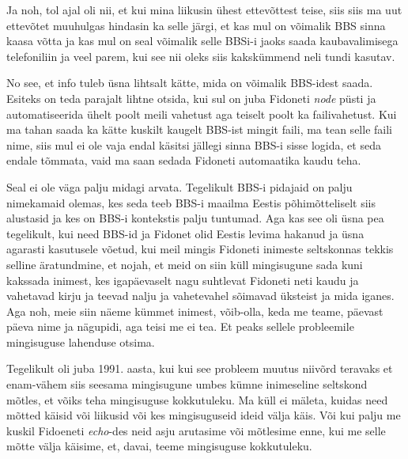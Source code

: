 Ja noh, tol ajal oli nii, et kui mina liikusin ühest ettevõttest teise, siis siis ma uut ettevõtet muuhulgas hindasin ka selle järgi, et kas mul on võimalik BBS sinna kaasa võtta ja kas mul on seal võimalik selle BBSi-i jaoks saada  kaubavalimisega telefoniliin ja veel parem, kui see nii oleks siis kakskümmend neli tundi kasutav.


No see, et info tuleb üsna lihtsalt kätte, mida on võimalik BBS-idest saada. Esiteks on teda parajalt lihtne otsida, kui sul on juba Fidoneti \emph{node} püsti ja automatiseerida ühelt poolt meili vahetust aga teiselt poolt ka failivahetust. Kui ma tahan saada ka kätte kuskilt kaugelt BBS-ist mingit faili, ma tean selle faili nime, siis mul ei ole vaja endal käsitsi jällegi sinna BBS-i sisse logida, et seda endale tõmmata, vaid ma saan sedada Fidoneti automaatika kaudu teha.


Seal ei ole väga palju midagi arvata. Tegelikult BBS-i pidajaid on  palju nimekamaid olemas, kes seda teeb BBS-i maailma Eestis põhimõtteliselt siis alustasid ja kes on BBS-i kontekstis palju tuntumad. Aga kas see oli üsna pea tegelikult, kui need BBS-id ja Fidonet  olid Eestis levima hakanud ja üsna agarasti kasutusele võetud, kui meil mingis Fidoneti inimeste seltskonnas  tekkis selline äratundmine, et nojah, et meid on siin küll mingisugune sada kuni kakssada inimest, kes igapäevaselt nagu suhtlevat Fidoneti neti kaudu ja vahetavad kirju ja teevad nalju ja vahetevahel sõimavad üksteist ja mida iganes. Aga noh, meie siin  näeme kümmet inimest, võib-olla, keda me teame, päevast päeva nime ja nägupidi, aga teisi me ei tea. Et peaks sellele probleemile mingisuguse lahenduse otsima. 

Tegelikult oli juba 1991. aasta, kui kui see probleem muutus niivõrd teravaks et enam-vähem siis seesama mingisugune umbes kümne inimeseline seltskond mõtles, et võiks teha mingisuguse kokkutuleku. Ma küll ei mäleta, kuidas need mõtted käisid või liikusid või kes mingisuguseid ideid välja käis. Või kui palju me kuskil Fidoeneti \emph{echo}-des neid asju arutasime või mõtlesime enne, kui me selle mõtte välja käisime, et, davai, teeme mingisuguse kokkutuleku.


